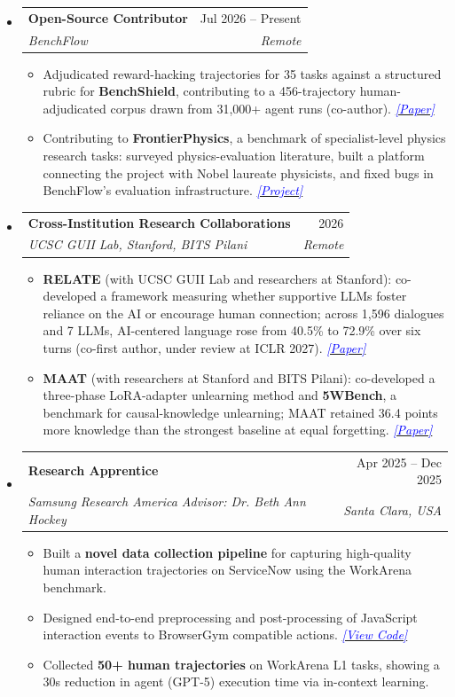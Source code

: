 \documentclass[letterpaper,11pt]{article}
\makeatletter
\newcommand{\resumeItem}[1]{
  \item{
    {#1 \vspace{-4pt}}
  }
}
\newcommand{\resumeSubheading}[4]{
  \vspace{-2pt}\item
    \begin{tabular*}{0.97\textwidth}[t]{l@{\extracolsep{\fill}}r}
      \textbf{#1} & #2 \\
      \textit{\small #3} & \textit{\small #4} \\
    \end{tabular*}\vspace{-10pt}
}
\newcommand{\resumeSubHeadingListStart}{\begin{itemize}[leftmargin=0.15in, label={}]}
\newcommand{\resumeSubHeadingListEnd}{\end{itemize}}
\newcommand{\resumeItemListStart}{\begin{itemize}}
\newcommand{\resumeItemListEnd}{\end{itemize}\vspace{-2pt}}
\newcommand{\codelink}[1]{\href{#1}{\textcolor{blue}{\textit{[View Code]}}}}
\newcommand{\paperlink}[2]{\href{#1}{\textcolor{blue}{\textit{[#2]}}}}
\makeatother
\begin{document}
\resumeSubHeadingListStart
\resumeSubheading
  {Open-Source Contributor}{Jul 2026 -- Present}
  {BenchFlow}{Remote}
  \resumeItemListStart
    \small
    \resumeItem{Adjudicated reward-hacking trajectories for 35 tasks against a structured rubric for \textbf{BenchShield}, contributing to a 456-trajectory human-adjudicated corpus drawn from 31{,}000+ agent runs (co-author). \paperlink{https://arxiv.org/abs/2609.11028}{Paper}}
    \resumeItem{Contributing to \textbf{FrontierPhysics}, a benchmark of specialist-level physics research tasks: surveyed physics-evaluation literature, built a platform connecting the project with Nobel laureate physicists, and fixed bugs in BenchFlow's evaluation infrastructure. \paperlink{https://www.benchflow.ai/frontierphysics}{Project}}
  \resumeItemListEnd
\resumeSubHeadingListEnd

\resumeSubHeadingListStart
\resumeSubheading
  {Cross-Institution Research Collaborations}{2026}
  {UCSC GUII Lab, Stanford, BITS Pilani}{Remote}
  \resumeItemListStart
    \small
    \resumeItem{\textbf{RELATE} (with UCSC GUII Lab and researchers at Stanford): co-developed a framework measuring whether supportive LLMs foster reliance on the AI or encourage human connection; across 1{,}596 dialogues and 7 LLMs, AI-centered language rose from 40.5\% to 72.9\% over six turns (co-first author, under review at ICLR 2027). \paperlink{https://arxiv.org/abs/2610.09569}{Paper}}
    \resumeItem{\textbf{MAAT} (with researchers at Stanford and BITS Pilani): co-developed a three-phase LoRA-adapter unlearning method and \textbf{5WBench}, a benchmark for causal-knowledge unlearning; MAAT retained 36.4 points more knowledge than the strongest baseline at equal forgetting. \paperlink{https://arxiv.org/abs/2605.30514}{Paper}}
  \resumeItemListEnd
\resumeSubHeadingListEnd

\resumeSubHeadingListStart
\resumeSubheading
  {Research Apprentice}{Apr 2025 -- Dec 2025}
  {Samsung Research America \textbullet{} Advisor: Dr. Beth Ann Hockey}{Santa Clara, USA}
  \resumeItemListStart
    \small
    \resumeItem{Built a \textbf{novel data collection pipeline} for capturing high-quality human interaction trajectories on ServiceNow using the WorkArena benchmark.}
    \resumeItem{Designed end-to-end preprocessing and post-processing of JavaScript interaction events to BrowserGym compatible actions. \codelink{https://github.com/jclymo/event-capture}}
    \resumeItem{Collected \textbf{50+ human trajectories} on WorkArena L1 tasks, showing a 30s reduction in agent (GPT-5) execution time via in-context learning.}
  \resumeItemListEnd
\resumeSubHeadingListEnd
\end{document}
